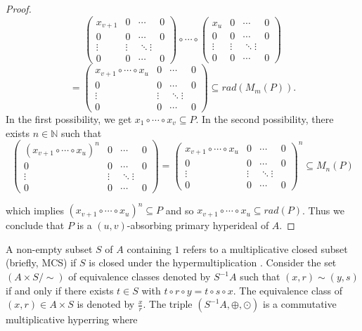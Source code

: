 \documentclass[preprint,review,10pt]{amsart}
\theoremstyle{definition}
\theoremstyle{remark}
\numberwithin{equation}{section}
\begin{document}
\begin{proof}
\[\begin{pmatrix}
x_{v+1} & 0 & \cdots & 0\\
0 & 0 & \cdots & 0\\
\vdots& \vdots & \ddots \vdots\\
0 & 0 & \cdots & 0
\end{pmatrix} 
\circ \cdots \circ
\begin{pmatrix}
x_u & 0 & \cdots & 0\\
0 & 0 & \cdots & 0\\
\vdots& \vdots & \ddots \vdots\\
0 & 0 & \cdots & 0
\end{pmatrix}\]
\[=
\begin{pmatrix}
x_{v+1} \circ \cdots \circ x_u & 0 & \cdots & 0\\
0 & 0 & \cdots & 0\\
\vdots& \vdots & \ddots \vdots\\
0 & 0 & \cdots & 0
\end{pmatrix}
\subseteq rad(M_m(P)).\]
In the first possibility, we get $x_1 \circ \cdots \circ x_v \subseteq P$. 
In the second possibility, there exists $n \in \mathbb{N}$ such that 
\[\begin{pmatrix}
(x_{v+1} \circ \cdots \circ x_u)^n & 0 & \cdots & 0\\
0 & 0 & \cdots & 0\\
\vdots& \vdots & \ddots \vdots\\
0 & 0 & \cdots & 0
\end{pmatrix}=
\begin{pmatrix}
x_{v+1} \circ \cdots \circ x_u & 0 & \cdots & 0\\
0 & 0 & \cdots & 0\\
\vdots& \vdots & \ddots \vdots\\
0 & 0 & \cdots & 0
\end{pmatrix}^n \subseteq M_n(P)\]

which implies $(x_{v+1} \circ \cdots \circ x_u)^n  \subseteq P$ and so $x_{v+1} \circ \cdots \circ x_u \subseteq rad(P)$. Thus we conclude that  $P$ is a $(u,v)$-absorbing primary hyperideal of $A$. 
\end{proof}
A non-empty subset $S$ of $A$ containing $1$  refers to a multiplicative closed subset (briefly, MCS) if $S$ is closed under the hypermultiplication  \cite{ameri}. Consider the set $(A \times S / \sim)$ of equivalence classes denoted by $S^{-1}A$ such that $(x,r) \sim (y,s)$ if and only if there exists $ t \in S $ with $ t \circ r \circ y=t \circ s \circ x$.
The equivalence class of $(x,r) \in A \times S$ is denoted by $\frac{x}{r}$. The triple $(S^{-1}A, \oplus, \odot)$ is a commutative multiplicative hyperring where
\end{document}
